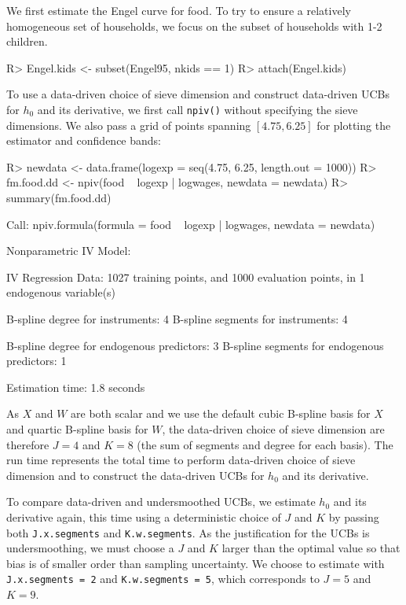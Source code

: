 \documentclass[
]{jss}
\begin{document}
We first estimate the Engel curve for food. To try to ensure a
relatively homogeneous set of households, we focus on the subset of
households with 1-2 children.

\begin{CodeChunk}
\begin{CodeInput}
R> Engel.kids <- subset(Engel95, nkids == 1)
R> attach(Engel.kids)
\end{CodeInput}
\end{CodeChunk}

To use a data-driven choice of sieve dimension and construct data-driven
UCBs for \(h_0\) and its derivative, we first call \texttt{npiv()}
without specifying the sieve dimensions. We also pass a grid of points
spanning \([4.75, 6.25]\) for plotting the estimator and confidence
bands:

\begin{CodeChunk}
\begin{CodeInput}
R> newdata <- data.frame(logexp = seq(4.75, 6.25, length.out = 1000))
R> fm.food.dd <- npiv(food ~ logexp | logwages, newdata = newdata)
R> summary(fm.food.dd)
\end{CodeInput}
\begin{CodeOutput}
Call:
npiv.formula(formula = food ~ logexp | logwages, newdata = newdata)

Nonparametric IV Model:

IV Regression Data: 1027 training points, and 1000 evaluation points, in 1 endogenous variable(s)

B-spline degree for instruments:             4
B-spline segments for instruments:           4

B-spline degree for endogenous predictors:   3
B-spline segments for endogenous predictors: 1

Estimation time: 1.8 seconds
\end{CodeOutput}
\end{CodeChunk}

As \(X\) and \(W\) are both scalar and we use the default cubic B-spline
basis for \(X\) and quartic B-spline basis for \(W\), the data-driven
choice of sieve dimension are therefore \(J = 4\) and \(K = 8\) (the sum
of segments and degree for each basis). The run time represents the
total time to perform data-driven choice of sieve dimension and to
construct the data-driven UCBs for \(h_0\) and its derivative.

To compare data-driven and undersmoothed UCBs, we estimate \(h_0\) and
its derivative again, this time using a deterministic choice of \(J\)
and \(K\) by passing both \texttt{J.x.segments} and
\texttt{K.w.segments}. As the justification for the UCBs is
undersmoothing, we must choose a \(J\) and \(K\) larger than the optimal
value so that bias is of smaller order than sampling uncertainty. We
choose to estimate with \texttt{J.x.segments\ =\ 2} and
\texttt{K.w.segments\ =\ 5}, which corresponds to \(J = 5\) and
\(K = 9\).
\end{document}
